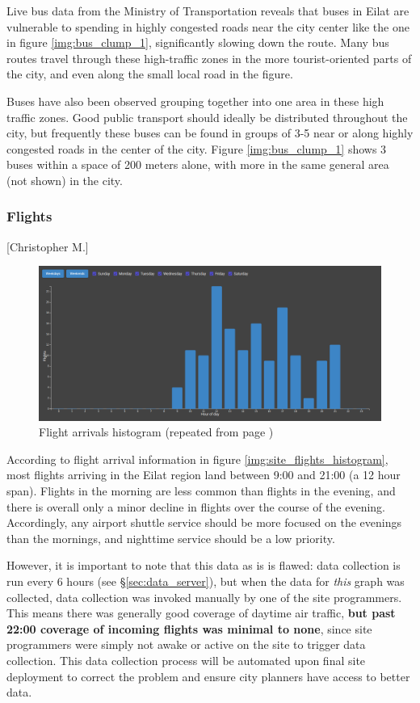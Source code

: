 \documentclass[12pt]{article}                       %
\newcommand{\repeatcaption}[2]{
  \renewcommand{\thefigure}{\ref{#1}}
  \captionsetup{list=no}
  \caption{#2 (repeated from page \pageref{#1})}
}
\begin{document}
Live bus data from the Ministry of Transportation reveals that buses in Eilat are vulnerable to spending in highly congested roads near the city center like the one in figure \ref{img:bus_clump_1}, significantly slowing down the route. Many bus routes travel through these high-traffic zones in the more tourist-oriented parts of the city, and even along the small local road in the figure.

Buses have also been observed grouping together into one area in these high traffic zones. Good public transport should ideally be distributed throughout the city, but frequently these buses can be found in groups of 3-5 near or along highly congested roads in the center of the city. Figure \ref{img:bus_clump_1} shows 3 buses within a space of 200 meters alone, with more in the same general area (not shown) in the city.

\subsubsection{Flights}[Christopher M.]
\begin{figure}[H]
    \centering
    \includegraphics[width=0.8\columnwidth]{images/site_flights_graph.png}
    \repeatcaption{img:site_flights_histogram}{Flight arrivals histogram}
\end{figure}

According to flight arrival information in figure \ref{img:site_flights_histogram}, most flights arriving in the Eilat region land between 9:00 and 21:00 (a 12 hour span). Flights in the morning are less common than flights in the evening, and there is overall only a minor decline in flights over the course of the evening. Accordingly, any airport shuttle service should be more focused on the evenings than the mornings, and nighttime service should be a low priority.

However, it is important to note that this data as is is flawed: data collection is run every 6 hours (see \S\ref{sec:data_server}), but when the data for \textit{this} graph was collected, data collection was invoked manually by one of the site programmers. This means there was generally good coverage of daytime air traffic, \textbf{but past 22:00 coverage of incoming flights was minimal to none}, since site programmers were simply not awake or active on the site to trigger data collection. This data collection process will be automated upon final site deployment to correct the problem and ensure city planners have access to better data.
\end{document}
